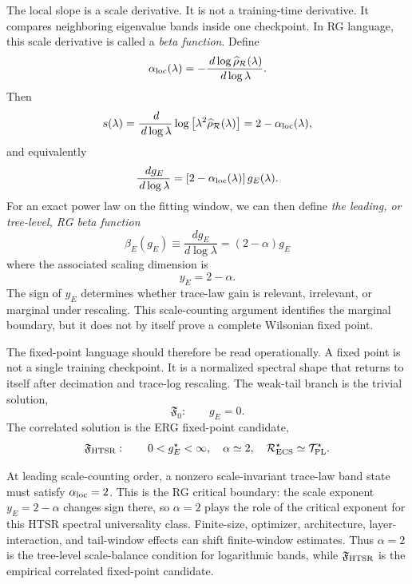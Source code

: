 \documentclass[10pt,twocolumn]{article}
\newcommand{\Fzero}{\mathfrak F_0}
\newcommand{\Fhtsr}{\mathfrak F_{\rm HTSR}}
\newcommand{\dd}{\,d}
\newcommand{\Rell}{\mathcal R}
\newcommand{\rhohat}{\widehat\rho}
\begin{document}
The local slope is a scale derivative. It is not a training-time derivative. It compares neighboring eigenvalue bands inside one checkpoint. In RG language, this scale derivative is called a \emph{beta function}. Define
\begin{equation}
\alpha_{\rm loc}(\lambda)=
-\frac{\dd\log\rhohat_{\Rell}(\lambda)}{\dd\log\lambda}.
\label{eq:alpha_loc}
\end{equation}
Then
\begin{equation}
s(\lambda)=\frac{\dd}{\dd\log\lambda}
\log\left[\lambda^2\rhohat_{\Rell}(\lambda)\right]
=2-\alpha_{\rm loc}(\lambda),
\label{eq:slope_correct}
\end{equation}
and equivalently
\begin{equation}
\frac{\dd g_E}{\dd\log\lambda}=
\left[2-\alpha_{\rm loc}(\lambda)\right]g_E(\lambda).
\label{eq:beta_local}
\end{equation}
For an exact power law on the fitting window, we can then define
\emph{the leading, or tree-level, RG beta function} 
\begin{equation}
\beta_E(g_E)
\equiv
\frac{dg_E}{d\log\lambda}
=
(2-\alpha)g_E 
\end{equation}
where the associated scaling dimension is
\begin{equation}
y_E = 2-\alpha .
\end{equation}
The sign of $y_E$ determines whether trace-law gain is
relevant, irrelevant, or marginal under rescaling.
This scale-counting argument identifies the marginal
boundary, but it does not by itself prove a complete
Wilsonian fixed point.

The fixed-point language should therefore be read operationally. A fixed point is not a single training checkpoint. It is a normalized spectral shape that returns to itself after decimation and trace-log rescaling. The weak-tail branch is the trivial solution,
\begin{equation}
\Fzero:\qquad g_E=0.
\label{eq:F0}
\end{equation}
The correlated solution is the ERG fixed-point candidate,
\begin{equation}
\Fhtsr:\qquad
0<g_E^\star<\infty,
\quad
\alpha\simeq2,
\quad
\mathcal R_{\rm ECS}^\star\simeq\mathcal T_{\rm PL}^\star.
\label{eq:FHTSR}
\end{equation}

At leading scale-counting order, a nonzero scale-invariant trace-law band state must satisfy $\alpha_{\rm loc}=2$. This is the RG critical boundary: the scale exponent $y_E=2-\alpha$ changes sign there, so $\alpha=2$ plays the role of the critical exponent for this HTSR spectral universality class. Finite-size, optimizer, architecture, layer-interaction, and tail-window effects can shift finite-window estimates. Thus $\alpha=2$ is the tree-level scale-balance condition for logarithmic bands, while $\Fhtsr$ is the empirical correlated fixed-point candidate.
\end{document}
